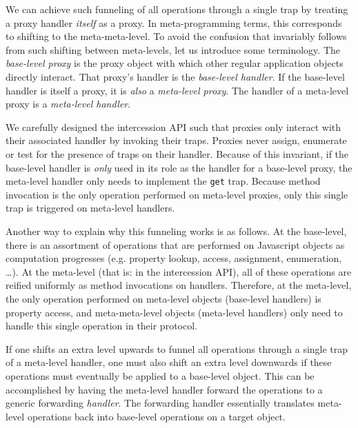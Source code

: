 \documentclass{acm_proc_article-sp}
\begin{document}
We can achieve such funneling of all operations through a single trap by treating a proxy handler \emph{itself} as a proxy. In meta-programming terms, this corresponds to shifting to the meta-meta-level. To avoid the confusion that invariably follows from such shifting between meta-levels, let us introduce some terminology. The \emph{base-level proxy} is the proxy object with which other regular application objects directly interact. That proxy's handler is the \emph{base-level handler}. If the base-level handler is itself a proxy, it is \emph{also} a \emph{meta-level proxy}. The handler of a meta-level proxy is a \emph{meta-level handler}.

We carefully designed the intercession API such that proxies only interact with their associated handler by invoking their traps. Proxies never assign, enumerate or test for the presence of traps on their handler. Because of this invariant, if the base-level handler is \emph{only} used in its role as the handler for a base-level proxy, the meta-level handler only needs to implement the \texttt{get} trap. Because method invocation is the only operation performed on meta-level proxies, only this single trap is triggered on meta-level handlers.


Another way to explain why this funneling works is as follows. At the base-level, there is an assortment of operations that are performed on Javascript objects as computation progresses (e.g. property lookup, access, assignment, enumeration, \ldots). At the meta-level (that is: in the intercession API), all of these operations are reified uniformly as method invocations on handlers. Therefore, at the meta-level, the only operation performed on meta-level objects (base-level handlers) is property access, and meta-meta-level objects (meta-level handlers) only need to handle this single operation in their protocol.

If one shifts an extra level upwards to funnel all operations through a single trap of a meta-level handler, one must also shift an extra level downwards if these operations must eventually be applied to a base-level object. This can be accomplished by having the meta-level handler forward the operations to a generic forwarding \emph{handler}. The forwarding handler essentially translates meta-level operations back into base-level operations on a target object.
\end{document}
